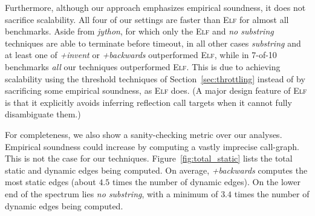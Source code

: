   Furthermore, although our approach emphasizes empirical soundness,
  it does not sacrifice scalability. All four of our settings are
  faster than \textsc{Elf} for almost all benchmarks. Aside from
  \emph{jython}, for which only the \textsc{Elf} and \emph{no
    substring} techniques are able to terminate before timeout, in
  all other cases \emph{substring} and at least one of \emph{+invent}
  or \emph{+backwards} outperformed \textsc{Elf}, while in 7-of-10
  benchmarks \emph{all} our techniques outperformed \textsc{Elf}.
  This is due to achieving scalability using the threshold techniques
  of Section~\ref{sec:throttling} instead of by sacrificing some
  empirical soundness, as \textsc{Elf} does. (A major design feature
  of \textsc{Elf} is that it explicitly avoids inferring reflection
  call targets when it cannot fully disambiguate them.)


  
  For completeness, we also show a sanity-checking metric over
  our analyses. Empirical soundness could
  increase by computing a vastly imprecise call-graph. This is not the
  case for our techniques. Figure~\ref{fig:total_static} lists the
  total static and dynamic edges being computed. On average,
  \emph{+backwards} computes the most static edges (about $4.5$ times
  the number of dynamic edges). On the lower end of the spectrum lies
  \emph{no substring}, with a minimum of $3.4$ times the number of
  dynamic edges being computed.



